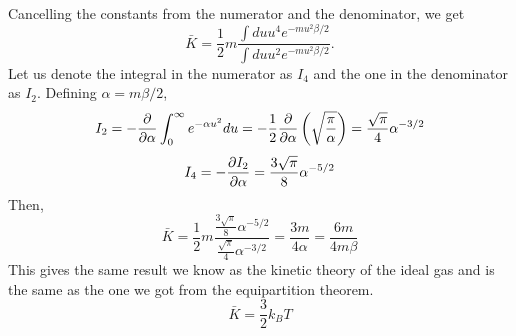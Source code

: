     Cancelling the constants from the numerator and the denominator, we get
    \begin{equation}
        \bar{K}=\frac{1}{2}m\frac{\int du u^4e^{-mu^2\beta/2}}{\int du u^2e^{-mu^2\beta/2}}.
    \end{equation}
    Let us denote the integral in the numerator as $I_4$ and the one in the denominator as $I_2$. Defining $\alpha = m\beta/2$, 
    \begin{equation}
        I_2 = -\frac{\partial }{\partial \alpha}\int_0^\infty e^{-\alpha u^2}du=-\frac{1}{2}\frac{\partial }{\partial \alpha}\left( \sqrt{\frac{\pi}{\alpha}} \right)=\frac{\sqrt{\pi}}{4}\alpha^{-3/2}
    \end{equation}
    \begin{equation}
        I_4 = -\frac{\partial I_2}{\partial \alpha} = \frac{3\sqrt{\pi}}{8}\alpha^{-5/2}
    \end{equation}
    Then,
    \begin{equation}
        \bar{K} = \frac{1}{2}m\frac{\frac{3\sqrt{\pi}}{8}\alpha^{-5/2}}{\frac{\sqrt{\pi}}{4}\alpha^{-3/2}}=\frac{3m}{4\alpha} = \frac{6m}{4m\beta}
    \end{equation}
    This gives the same result we know as the kinetic theory of the ideal gas and is the same as the one we got from the equipartition theorem.
    \begin{equation}
        \bar{K} = \frac{3}{2}k_BT
    \end{equation}
